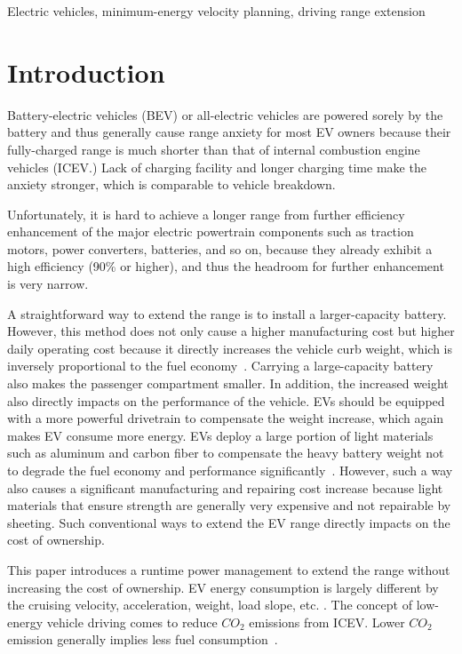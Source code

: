 \documentclass{IEEEtran}
\begin{document}
\begin{IEEEkeywords}
Electric vehicles, minimum-energy velocity planning, driving range extension
\end{IEEEkeywords}
\section{Introduction}

Battery-electric vehicles (BEV) or all-electric vehicles are powered sorely by the battery and thus generally cause range anxiety for most EV owners because their fully-charged range is much shorter than that of internal combustion engine vehicles (ICEV.) Lack of charging facility and longer charging time make the anxiety stronger, which is comparable to vehicle breakdown.

Unfortunately, it is hard to achieve a longer range from further efficiency enhancement of the major electric powertrain components such as traction motors, power converters, batteries, and so on, because they already exhibit a high efficiency (90\% or higher), and thus the headroom for further enhancement is very narrow.

A straightforward way to extend the range is to install a larger-capacity battery. However, this method does not only cause a higher manufacturing cost but higher daily operating cost because it  directly increases the vehicle curb weight, which is inversely proportional to the fuel economy~\cite{Hong:ASPDAC16}. Carrying a large-capacity battery also makes the passenger compartment smaller. In addition, the increased weight also directly impacts on the performance of the vehicle. 
EVs should be equipped with a more powerful drivetrain to compensate the weight increase, which again makes EV consume more energy. 
EVs deploy a large portion of light materials such as aluminum and carbon fiber to compensate the heavy battery weight not to degrade the fuel economy and performance significantly~\cite{Chang:ICCAD14}. However, such a way also causes a significant manufacturing and repairing cost increase because light materials that ensure strength are generally very expensive and not repairable by sheeting. Such conventional ways to extend the EV range directly impacts on the cost of ownership.

This paper introduces a runtime power management to extend the range without increasing the cost of ownership. EV energy consumption is largely different by the cruising velocity, acceleration, weight, load slope, etc. \cite{Chang:ICCAD14}. The concept of low-energy vehicle driving comes to reduce $CO_2$ emissions from ICEV. Lower  $CO_2$ emission generally implies less fuel consumption~\cite{Seraens:thesis12}. 
\end{document}
